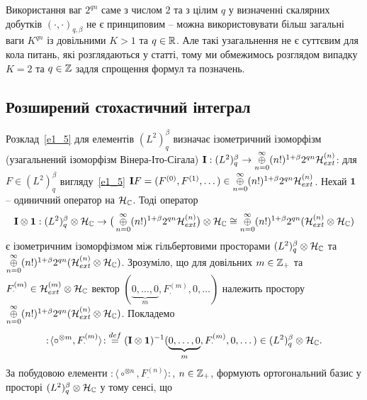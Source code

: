 \begin{subremark}
Використання ваг $2^{qn}$ саме з числом $2$ та з цілим $q$ у визначенні скалярних добутків
$(\cdot,\cdot)_{q,\beta}$ не є принциповим -- можна використовувати більш загальні
ваги $K^{qn}$ із довільними $K>1$ та $q\in\mathbb{R}$. Але такі узагальнення не є суттєвим для
кола питань, які розглядаються у статті, тому ми обмежимось розглядом випадку $K=2$ та
$q\in\mathbb{Z}$ задля спрощення формул та позначень.
\end{subremark}

\subsection{Розширений стохастичний інтеграл}\label{S1_4}
Розклад~\eqref{e1_5} для елементів $(L^2)^\beta_q$ визначає ізометричний ізоморфізм
(узагальнений ізоморфізм Вінера-Іто-Сігала)
$\mathbf I: (L^2)^\beta_q\to\mathop{\oplus}\limits_{n=0}^\infty (n!)^{1+\beta}2^{qn}
\mathcal{H}_{ext}^{(n)}$:
для $F\in (L^2)^\beta_q$ вигляду~\eqref{e1_5}
$\mathbf IF=(F^{(0)},F^{(1)},\dots)
\in\mathop{\oplus}\limits_{n=0}^\infty (n!)^{1+\beta}2^{qn}\mathcal{H}_{ext}^{(n)}$.
Нехай $\mathbf 1$ -- одиничний оператор на $\mathcal{H}_{\mathbb{C}}$. Тоді оператор
\begin{equation*}
\mathbf I\otimes\mathbf 1:
(L^2)^\beta_q\otimes\mathcal{H}_{\mathbb{C}}
\to\big(\mathop{\oplus}\limits_{n=0}^\infty (n!)^{1+\beta}2^{qn}
\mathcal{H}_{ext}^{(n)}\big)\otimes\mathcal{H}_{\mathbb{C}}\cong
\mathop{\oplus}\limits_{n=0}^\infty (n!)^{1+\beta}2^{qn}
(\mathcal{H}_{ext}^{(n)}\otimes\mathcal{H}_{\mathbb{C}})
\end{equation*}
є ізометричним ізоморфізмом між гільбертовими просторами
$(L^2)^\beta_q\otimes\mathcal{H}_{\mathbb{C}}$ та
$\mathop{\oplus}\limits_{n=0}^\infty (n!)^{1+\beta}2^{qn}
(\mathcal{H}_{ext}^{(n)}\otimes\mathcal{H}_{\mathbb{C}})$. Зрозуміло, що для довільних
$m\in\mathbb{Z}_+$ та $F^{(m)}_\cdot
\in\mathcal{H}_{ext}^{(m)}\otimes\mathcal{H}_{\mathbb{C}}$ вектор
$(\underset{m}{\underbrace{0,\dots,0}},
F^{(m)}_\cdot,0,\dots)$ належить простору
$\mathop{\oplus}\limits_{n=0}^\infty (n!)^{1+\beta}2^{qn}
(\mathcal{H}_{ext}^{(n)}\otimes\mathcal{H}_{\mathbb{C}})$. Покладемо
\begin{equation*}
{:\!\langle}\circ^{\otimes m},F^{(m)}_\cdot{\rangle\!:}
\overset{def}=(\mathbf I\otimes\mathbf 1)^{-1}(\underset{m}
{\underbrace{0,\dots,0}},F^{(m)}_\cdot,0,\dots)\in (L^2)^\beta_q
\otimes\mathcal{H}_{\mathbb{C}}.
\end{equation*}
За побудовою елементи ${:\!\langle}\circ^{\otimes n},
F^{(n)}_\cdot{\rangle\!:}$, $n\in\mathbb{Z}_+$, формують ортогональний базис у
просторі $(L^2)^\beta_q\otimes\mathcal{H}_{\mathbb{C}}$ у тому сенсі, що
